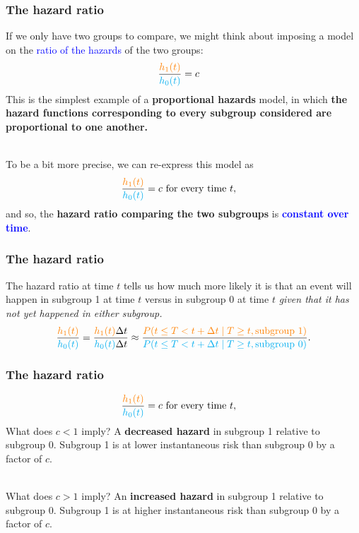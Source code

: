 \documentclass[10pt,t]{beamer}
\begin{document}
\begin{frame}
\frametitle{The hazard ratio}
If we only have two groups to compare, we might think about imposing a model on the \textcolor{blue}{ratio of the hazards} of the two groups:
\begin{align*}
\frac{\textcolor{orange}{h_1(t)}}{\textcolor{cyan}{h_0(t)}} &= c
\end{align*}
This is the simplest example of a \textbf{proportional hazards} model, in which \textbf{the hazard functions corresponding to every subgroup considered are proportional to one another.}
\\ ~\ 

To be a bit more precise, we can re-express this model as
\begin{align*}
\frac{\textcolor{orange}{h_1(t)}}{\textcolor{cyan}{h_0(t)}} &= c \text{ for every time } t,
\end{align*}
and so, the \textbf{hazard ratio comparing the two subgroups} is \textbf{\textcolor{blue}{constant over time}}.

\end{frame}

\begin{frame}
\frametitle{The hazard ratio}
The hazard ratio at time $t$ tells us how much more likely it is that an event will happen in subgroup 1 at time $t$ versus in subgroup 0 at time $t$ \textit{given that it has not yet happened in either subgroup.}
\begin{align*}
\frac{\textcolor{orange}{h_1(t)}}{\textcolor{cyan}{h_0(t)}} = \frac{\textcolor{orange}{h_1(t)}\Delta t}{\textcolor{cyan}{h_0(t)}\Delta t} \approx \frac{\textcolor{orange}{P(t \leq T < t + \Delta t \mid T \geq t, \text{subgroup }1)}}{\textcolor{cyan}{P(t \leq T < t + \Delta t \mid T \geq t, \text{subgroup }0)}}.
\end{align*}

\end{frame}

\begin{frame}
\frametitle{The hazard ratio}
\begin{align*}
	\frac{\textcolor{orange}{h_1(t)}}{\textcolor{cyan}{h_0(t)}} &= c \text{ for every time } t,
\end{align*}
What does $c < 1$ imply?   A \textbf{decreased hazard} in subgroup 1 relative to subgroup 0. Subgroup 1 is at lower instantaneous risk than subgroup 0 by a factor of $c$.  
\\ ~\ 

What does $c > 1$ imply?   An \textbf{increased hazard} in subgroup 1 relative to subgroup 0.  Subgroup 1 is at higher instantaneous risk than subgroup 0 by a factor of $c$.
\end{frame}
\end{document}
